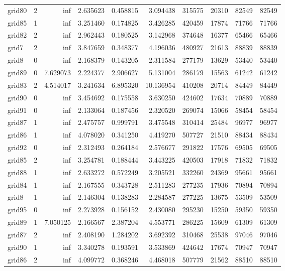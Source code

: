 \begin{longtable}{|l|r|r|r|r|r|r|r|r|r|}
grid80 & 2 & inf & 2.635623 & 0.458815 & 3.094438 & 315575 & 20310 & 82549 & 82549 \\
grid85 & 1 & inf & 3.251460 & 0.174825 & 3.426285 & 420459 & 17874 & 71766 & 71766 \\
grid82 & 2 & inf & 2.962443 & 0.180525 & 3.142968 & 374648 & 16377 & 65466 & 65466 \\
grid7 & 2 & inf & 3.847659 & 0.348377 & 4.196036 & 480927 & 21613 & 88839 & 88839 \\
grid8 & 0 & inf & 2.168379 & 0.143205 & 2.311584 & 277179 & 13629 & 53440 & 53440 \\
grid89 & 0 & 7.629073 & 2.224377 & 2.906627 & 5.131004 & 286179 & 15563 & 61242 & 61242 \\
grid83 & 2 & 4.514017 & 3.241634 & 6.895320 & 10.136954 & 410208 & 20714 & 84449 & 84449 \\
grid90 & 0 & inf & 3.454692 & 0.175558 & 3.630250 & 424602 & 17634 & 70889 & 70889 \\
grid91 & 0 & inf & 2.133064 & 0.187456 & 2.320520 & 269074 & 15066 & 58454 & 58454 \\
grid87 & 1 & inf & 2.475757 & 0.999791 & 3.475548 & 310414 & 25484 & 96977 & 96977 \\
grid86 & 1 & inf & 4.078020 & 0.341250 & 4.419270 & 507727 & 21510 & 88434 & 88434 \\
grid92 & 0 & inf & 2.312493 & 0.264184 & 2.576677 & 291822 & 17576 & 69505 & 69505 \\
grid85 & 2 & inf & 3.254781 & 0.188444 & 3.443225 & 420503 & 17918 & 71832 & 71832 \\
grid88 & 1 & inf & 2.633272 & 0.572249 & 3.205521 & 332260 & 24369 & 95661 & 95661 \\
grid84 & 1 & inf & 2.167555 & 0.343728 & 2.511283 & 277235 & 17936 & 70894 & 70894 \\
grid8 & 1 & inf & 2.146304 & 0.138283 & 2.284587 & 277225 & 13675 & 53509 & 53509 \\
grid95 & 0 & inf & 2.273928 & 0.156152 & 2.430080 & 295230 & 15250 & 59350 & 59350 \\
grid89 & 1 & 7.050125 & 2.166567 & 2.387204 & 4.553771 & 286225 & 15609 & 61309 & 61309 \\
grid87 & 2 & inf & 2.408190 & 1.284202 & 3.692392 & 310468 & 25538 & 97046 & 97046 \\
grid90 & 1 & inf & 3.340278 & 0.193591 & 3.533869 & 424642 & 17674 & 70947 & 70947 \\
grid86 & 2 & inf & 4.099772 & 0.368246 & 4.468018 & 507779 & 21562 & 88510 & 88510 \\

\end{longtable}
